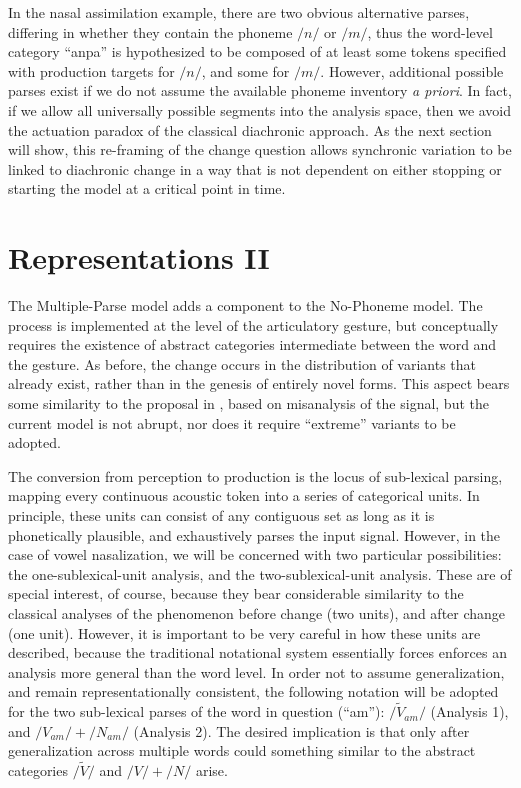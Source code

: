 In the nasal assimilation example, there are two obvious alternative
parses, differing in whether they contain the phoneme $/n/$ or $/m/$,
thus the word-level category “anpa” is hypothesized to be composed
of at least some tokens specified with production targets for $/n/$,
and some for $/m/$. However, additional possible parses exist if
we do not assume the available phoneme inventory \emph{a priori}.
In fact, if we allow all universally possible segments into the analysis
space, then we avoid the actuation paradox of the classical diachronic
approach. As the next section will show, this re-framing of the change
question allows synchronic variation to be linked to diachronic change
in a way that is not dependent on either stopping or starting the
model at a critical point in time. 

\section{Representations II}

The Multiple-Parse model adds a  component to the No-Phoneme
model. The process is implemented at the level of the articulatory
gesture, but conceptually requires the existence of abstract categories
intermediate between the word and the gesture. As before, the change
occurs in the distribution of variants that already exist, rather
than in the genesis of entirely novel forms. This aspect bears some
similarity to the proposal in \citet{Baker2011}, based on misanalysis
of the signal, but the current model is not abrupt, nor does it require
“extreme” variants to be adopted.

The conversion from perception to production is the locus of sub-lexical
parsing, mapping every continuous acoustic token into a series of
categorical units. In principle, these units can consist of any contiguous
set as long as it is phonetically plausible, and exhaustively parses
the input signal. However, in the case of vowel nasalization, we will
be concerned with two particular possibilities: the one-sublexical-unit
analysis, and the two-sublexical-unit analysis. These are of special
interest, of course, because they bear considerable similarity to
the classical analyses of the phenomenon before change (two units),
and after change (one unit). However, it is important to be very careful
in how these units are described, because the traditional notational
system essentially forces enforces an analysis more general than the
word level. In order not to assume generalization, and remain representationally
consistent, the following notation will be adopted for the two sub-lexical
parses of the word in question (“am”): $/\tilde{V}_{am}/$ (Analysis
1), and $/V_{am}/+/N_{am}/$ (Analysis 2). The desired implication
is that only after generalization across multiple words could something
similar to the abstract categories $/\widetilde{V}/$ and $/V/+/N/$
arise.


